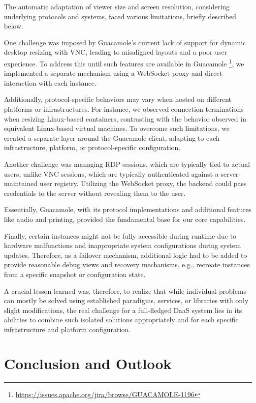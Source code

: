 \documentclass[runningheads]{llncs}
\begin{document}
The automatic adaptation of viewer size and screen resolution,
considering underlying protocols and systems,
faced various limitations, briefly described below.

One challenge was imposed by Guacamole's current lack of support
for dynamic desktop resizing with VNC,
leading to misaligned layouts and a poor user experience.
To address this until such features are available in Guacamole
\footnote{\url{https://issues.apache.org/jira/browse/GUACAMOLE-1196}},
we implemented a separate mechanism using a WebSocket proxy
and direct interaction with each instance.

Additionally, protocol-specific behaviors may vary
when hosted on different platforms or infrastructures.
For instance, we observed connection terminations when resizing Linux-based containers,
contrasting with the behavior observed in equivalent Linux-based virtual machines.
To overcome such limitations, we created a separate layer around the Guacamole client,
adapting to each infrastructure, platform, or protocol-specific configuration.

Another challenge was managing RDP sessions, which are typically tied to actual users,
unlike VNC sessions, which are typically authenticated against
a server-maintained user registry.
Utilizing the WebSocket proxy, the backend could pass credentials
to the server without revealing them to the user.

Essentially, Guacamole, with its protocol implementations and additional features like audio and printing,
provided the fundamental base for our core capabilities.

Finally, certain instances might not be fully accessible during runtime
due to hardware malfunctions and inappropriate system configurations during system updates.
Therefore, as a failover mechanism, additional logic had to be added
to provide reasonable debug views and recovery mechanisms,
e.g., recreate instances from a specific snapshot or configuration state.

A crucial lesson learned was, therefore, to realize that
while individual problems can mostly be solved
using established paradigms, services, or libraries with only slight modifications,
the real challenge for a full-fledged DaaS system lies in its abilities
to combine such isolated solutions appropriately
and for each specific infrastructure and platform configuration.

\section{Conclusion and Outlook}
\label{sec:Conclusions}
\end{document}
